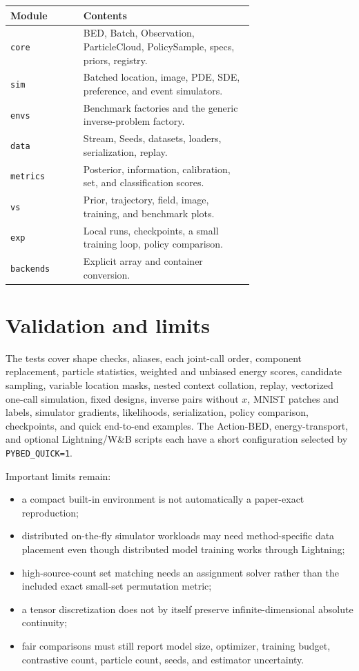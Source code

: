 \documentclass[11pt]{article}
\begin{document}
\begin{center}
\begin{tabular}{lp{0.70\linewidth}}
\toprule
Module & Contents \\
\midrule
\texttt{core} & BED, Batch, Observation, ParticleCloud, PolicySample, specs, priors, registry. \\
\texttt{sim} & Batched location, image, PDE, SDE, preference, and event simulators. \\
\texttt{envs} & Benchmark factories and the generic inverse-problem factory. \\
\texttt{data} & Stream, Seeds, datasets, loaders, serialization, replay. \\
\texttt{metrics} & Posterior, information, calibration, set, and classification scores. \\
\texttt{vs} & Prior, trajectory, field, image, training, and benchmark plots. \\
\texttt{exp} & Local runs, checkpoints, a small training loop, policy comparison. \\
\texttt{backends} & Explicit array and container conversion. \\
\bottomrule
\end{tabular}
\end{center}

\section{Validation and limits}

The tests cover shape checks, aliases, each joint-call order, component replacement,
particle statistics, weighted and unbiased energy scores, candidate sampling,
variable location masks, nested context collation, replay, vectorized one-call
simulation, fixed designs, inverse pairs without $x$, MNIST patches and labels,
simulator gradients, likelihoods, serialization, policy comparison, checkpoints,
and quick end-to-end examples. The Action-BED, energy-transport, and optional
Lightning/W\&B scripts each have a short configuration selected by
\texttt{PYBED\_QUICK=1}.

Important limits remain:
\begin{itemize}
  \item a compact built-in environment is not automatically a paper-exact
  reproduction;
  \item distributed on-the-fly simulator workloads may need method-specific data
  placement even though distributed model training works through Lightning;
  \item high-source-count set matching needs an assignment solver rather than the
  included exact small-set permutation metric;
  \item a tensor discretization does not by itself preserve infinite-dimensional
  absolute continuity;
  \item fair comparisons must still report model size, optimizer, training budget,
  contrastive count, particle count, seeds, and estimator uncertainty.
\end{itemize}
\end{document}
